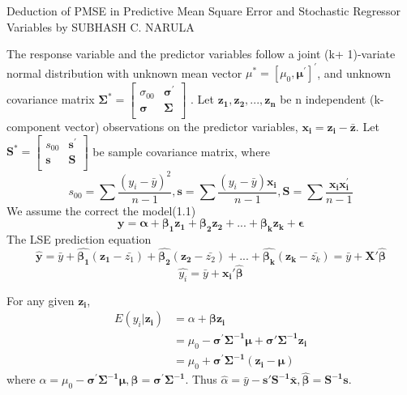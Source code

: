 \documentclass[11pt]{article}
\begin{document}

Deduction of PMSE in Predictive Mean Square Error and
 Stochastic Regressor Variables by  SUBHASH C. NARULA

The response variable and the predictor variables follow a joint
 (k+ 1)-variate normal distribution with unknown mean vector $\mu^{*}=[\mu_{0},\boldsymbol{\mu^{'}}]^{'}$, and unknown covariance matrix 
$ \boldsymbol{\Sigma^{*}}  =    
 \begin{bmatrix} 
    \sigma_{00} & \boldsymbol{\sigma^{'}} \\  
    \boldsymbol{\sigma} & \boldsymbol{\Sigma} \\  
\end{bmatrix}$ . Let $\boldsymbol {z_1, z_2,..., z_n}$ be n independent (k-component vector) observations on the predictor variables, $\boldsymbol{x_i=z_i-\bar{z}}$. Let $ \boldsymbol{S^{*}}  =    
 \begin{bmatrix} 
    s_{00} & \boldsymbol{s^{'}} \\  
    \boldsymbol{s} & \boldsymbol{S} \\  
\end{bmatrix}$ be sample covariance matrix, where 
$$s_{00}=\sum{\frac{(y_i-\bar{y})^2}{n-1}},\boldsymbol{s}=\sum{\frac{(y_i-\bar{y})\boldsymbol{x_i}}{n-1}}, \boldsymbol{S}=\sum{\frac{\boldsymbol{x_{i}x_{i}^{'}}}{n-1}}
$$
We assume the correct the model(1.1)
$$\boldsymbol{y=\alpha+ \beta_1z_1+\beta_2z_2+...+\beta_kz_k+\epsilon}$$
The LSE prediction equation 
$$
\boldsymbol{\hat{y}}=\bar{y}+\boldsymbol{\hat{\beta_1}}(\boldsymbol{z_1}-\bar{z_1})+\boldsymbol{\hat{\beta_2}}(\boldsymbol{z_2}-\bar{z_2})+...+\boldsymbol{\hat{\beta_k}}(\boldsymbol{z_k}-\bar{z_k})=\bar{y}+\boldsymbol{X'\hat{\beta}}$$
$$\hat{y_i}=\bar{y}+\boldsymbol{x_{i}'\hat{\beta}}
$$

For any given $\boldsymbol{z_i}$, 
$$\begin{aligned}
E(y_i|\boldsymbol{z_i})&=\alpha + \boldsymbol{\beta z_i}\\
&= \mu_{0}-\boldsymbol{\sigma^{'}\Sigma^{-1}\mu} + \boldsymbol{\sigma'\Sigma^{-1}z_i}\\
&=\mu_0+\boldsymbol{\sigma^{'}\Sigma^{-1}(z_i-\mu)}
\end{aligned}$$
where $\alpha=\mu_{0}-\boldsymbol{\sigma^{'}\Sigma^{-1}\mu}, \boldsymbol{\beta=\sigma^{'}\Sigma^{-1}}$. Thus $\hat{\alpha}=\bar{y}-\boldsymbol{s'S^{-1}\bar{x}},\boldsymbol{\hat{\beta}}=\boldsymbol{S^{-1}s}$.
\end{document}
